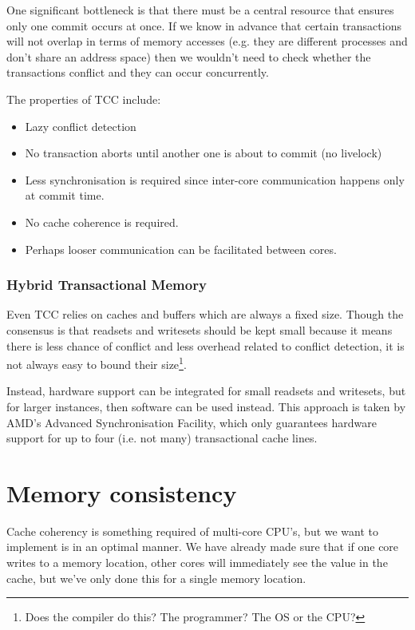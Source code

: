 One significant bottleneck is that there must be a central resource
that ensures only one commit occurs at once. If we know in advance
that certain transactions will not overlap in terms of memory accesses
(e.g. they are different processes and don't share an address space)
then we wouldn't need to check whether the transactions conflict and
they can occur concurrently.

The properties of TCC include:

\begin{itemize}
\item Lazy conflict detection
\item No transaction aborts until another one is about to commit (no livelock)
\item Less synchronisation is required since inter-core communication
happens only at commit time.
\item No cache coherence is required.
\item Perhaps looser communication can be facilitated between cores.
\end{itemize}

\subsubsection{Hybrid Transactional Memory}

Even TCC relies on caches and buffers which are always a fixed
size. Though the consensus is that readsets and writesets should be
kept small because it means there is less chance of conflict and less
overhead related to conflict detection, it is not always easy to bound
their size\footnote{Does the compiler do this? The programmer? The OS
or the CPU?}.

Instead, hardware support can be integrated for small readsets and
writesets, but for larger instances, then software can be used
instead. This approach is taken by AMD's Advanced Synchronisation
Facility, which only guarantees hardware support for up to four
(i.e. not many) transactional cache lines.


\section{Memory consistency}

Cache coherency is something required of multi-core CPU's, but we want
to implement is in an optimal manner. We have already made sure that
if one core writes to a memory location, other cores will immediately
see the value in the cache, but we've only done this for a single
memory location.

